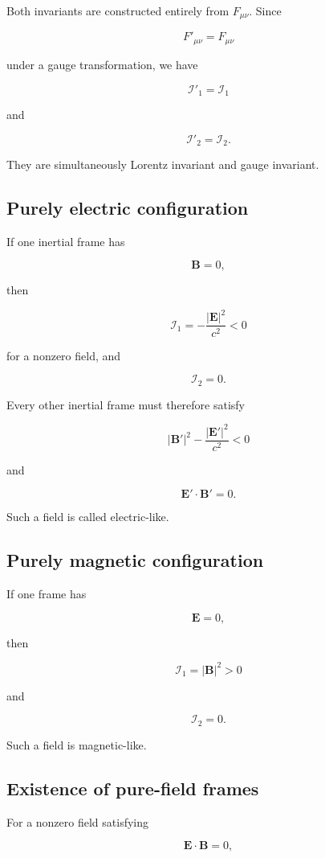 Both invariants are constructed entirely from \(F_{\mu\nu}\). Since

\[
F'_{\mu\nu}=F_{\mu\nu}
\]

under a gauge transformation, we have

\[
\mathcal{I}'_1
=
\mathcal{I}_1
\]

and

\[
\mathcal{I}'_2
=
\mathcal{I}_2.
\]

They are simultaneously Lorentz invariant and gauge invariant.

\subsection{Purely electric configuration}

If one inertial frame has

\[
\mathbf{B}=0,
\]

then

\[
\mathcal{I}_1
=
-
\frac{|\mathbf{E}|^2}{c^2}<0
\]

for a nonzero field, and

\[
\mathcal{I}_2=0.
\]

Every other inertial frame must therefore satisfy

\[
|\mathbf{B}'|^2
-
\frac{|\mathbf{E}'|^2}{c^2}<0
\]

and

\[
\mathbf{E}'\cdot\mathbf{B}'=0.
\]

Such a field is called electric-like.

\subsection{Purely magnetic configuration}

If one frame has

\[
\mathbf{E}=0,
\]

then

\[
\mathcal{I}_1
=
|\mathbf{B}|^2>0
\]

and

\[
\mathcal{I}_2=0.
\]

Such a field is magnetic-like.

\subsection{Existence of pure-field frames}

For a nonzero field satisfying

\[
\mathbf{E}\cdot\mathbf{B}=0,
\]

